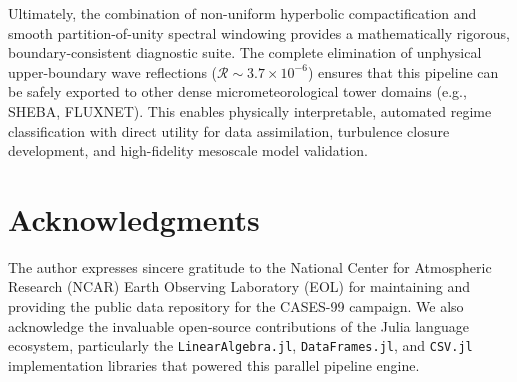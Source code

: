 Ultimately, the combination of non-uniform hyperbolic compactification and smooth partition-of-unity spectral windowing provides a mathematically rigorous, boundary-consistent diagnostic suite. The complete elimination of unphysical upper-boundary wave reflections ($\mathcal{R} \sim 3.7 \times 10^{-6}$) ensures that this pipeline can be safely exported to other dense micrometeorological tower domains (e.g., SHEBA, FLUXNET). This enables physically interpretable, automated regime classification with direct utility for data assimilation, turbulence closure development, and high-fidelity mesoscale model validation.

\section*{Acknowledgments}
The author expresses sincere gratitude to the National Center for Atmospheric Research (NCAR) Earth Observing Laboratory (EOL) for maintaining and providing the public data repository for the CASES-99 campaign. We also acknowledge the invaluable open-source contributions of the Julia language ecosystem, particularly the \texttt{LinearAlgebra.jl}, \texttt{DataFrames.jl}, and \texttt{CSV.jl} implementation libraries that powered this parallel pipeline engine.




